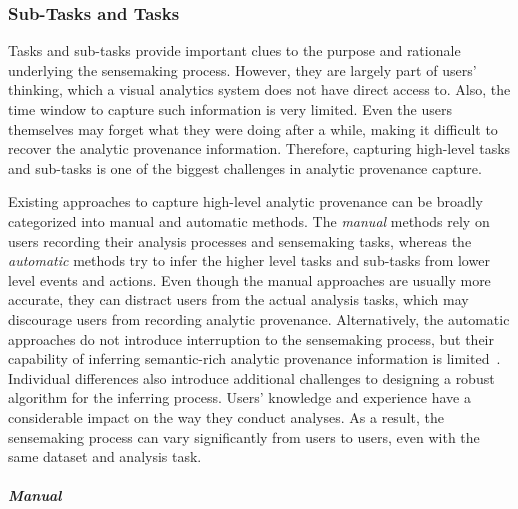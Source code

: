 \subsubsection{Sub-Tasks and Tasks}
Tasks and sub-tasks provide important clues to the purpose and rationale underlying the sensemaking process. However, they are largely part of users' thinking, which a visual analytics system does not have direct access to. Also, the time window to capture such information is very limited. Even the users themselves may forget what they were doing after a while, making it difficult to recover the analytic provenance information. Therefore, capturing high-level tasks and sub-tasks is one of the biggest challenges in analytic provenance capture.

Existing approaches to capture high-level analytic provenance can be broadly categorized into manual and automatic methods. The \emph{manual} methods rely on users recording their analysis processes and sensemaking tasks, whereas the \emph{automatic} methods try to infer the higher level tasks and sub-tasks from lower level events and actions. Even though the manual approaches are usually more accurate, they can distract users from the actual analysis tasks, which may discourage users from recording analytic provenance. Alternatively, the automatic approaches do not introduce interruption to the sensemaking process, but their capability of inferring semantic-rich analytic provenance information is limited~\cite{Gotz2009}. Individual differences also introduce additional challenges to designing a robust algorithm for the inferring process. Users' knowledge and experience have a considerable impact on the way they conduct analyses. As a result, the sensemaking process can vary significantly from users to users, even with the same dataset and analysis task.

\subparagraph{Manual}

